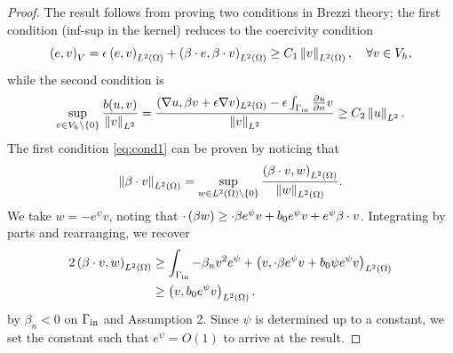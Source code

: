 \documentclass[final,leqno]{siamltex}
\newcommand{\nor}[1]{\left\| #1 \right\|}
\newcommand{\LRp}[1]{\left( #1 \right)}
\newcommand{\Grad} {\ensuremath{\nabla}}
\renewcommand{\L}{L^2\LRp{\Omega}}
\let\grad\relax
\newcommand{\grad}{\nabla}
\renewcommand{\div}{\grad \cdot}
\newcommand{\pd}[2]{\frac{\partial#1}{\partial#2}}
\begin{document}
\begin{proof}
The result follows from proving two conditions in Brezzi theory; the first condition (inf-sup in the kernel) reduces to the coercivity condition
\begin{equation}
\LRp{e,v}_V = \epsilon\LRp{\grad e,\grad v}_{\L} + \LRp{\beta\cdot\grad e,\beta\cdot \grad v}_{\L} \geq C_1\nor{v}_{\L},\quad \forall v\in V_h,
\label{eq:cond1}
\end{equation}
while the second condition is 
\begin{equation}
\sup_{v\in V_h\setminus \{0\}} \frac{b(u,v)}{\nor{v}_{L^2}} = \frac{ (\Grad u, \beta v + \epsilon \Grad v)_{\L} - \epsilon\int_{\Gamma_{\rm in}} \pd{u}{n}v}{\nor{v}_{L^2}} \geq C_2\nor{u}_{L^2}. 
\label{eq:cond2}
\end{equation}
The first condition \ref{eq:cond1} can be proven by noticing that 
\[
\nor{\beta\cdot\grad v}_{\L} = \sup_{w\in \L\setminus\{0\}}\frac{\LRp{\beta\cdot\grad v,w}_{\L}}{\nor{w}_{\L}}.
\]
We take $w = -e^{\psi}v$, noting that $\div \LRp{\beta w} \geq \div\beta e^\psi v + b_0 e^\psi v +  e^\psi \beta\cdot \grad v$.  Integrating by parts and rearranging, we recover
\begin{align*}
2\LRp{\beta\cdot\grad v,w}_{\L} &\geq \int_{\Gamma_{\rm in}} - \beta_n v^2e^\psi + \LRp{v,\div \beta e^\psi v + b_0 \psi e^\psi v}_{\L} \\
&\geq \LRp{v,b_0 e^\psi v}_{\L}.
\end{align*}
by $\beta_n < 0$ on $\Gamma_{\rm in}$ and Assumption 2.  Since $\psi$ is determined up to a constant, we set the constant such that $e^\psi = O(1)$ to arrive at the result.%


\end{proof}
\end{document}
